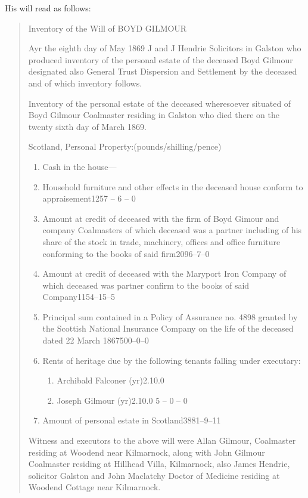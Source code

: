His will read as follows:

\begin{quotation}
Inventory of the Will of BOYD GILMOUR

Ayr the eighth day of May 1869 J and J Hendrie Solicitors in Galston who produced inventory of the personal estate of the deceased Boyd Gilmour designated also General Trust Dispersion and Settlement by the deceased and of which inventory follows.

Inventory of the personal estate of the deceased wheresoever situated of Boyd Gilmour Coalmaster residing in Galston who died there on the twenty sixth day of March 1869.

Scotland, Personal Property:\hfill(pounds/shilling/pence)

\begin{enumerate}
\item Cash in the house\hfill---
\item Household furniture and other effects in the deceased house conform to appraisement\hfill1257 – 6 – 0
\item Amount at credit of deceased with the firm of Boyd Gimour and company Coalmasters of which deceased was a partner including of his share of the stock in trade, machinery, offices and office furniture conforming to the books of said firm\hfill2096--7--0
\item Amount at credit of deceased with the Maryport Iron Company of which deceased was partner confirm to the books of said Company\hfill1154--15--5
\item Principal sum contained in a Policy of Assurance no. 4898 granted by the Scottish National Insurance Company on the life of the deceased dated 22 March 1867\hfill500--0--0
\item Rents of heritage due by the following tenants falling under executary:
\begin{enumerate}
 \item Archibald Falconer (\textonehalf yr)\hfill2.10.0
 \item Joseph Gilmour (\textonehalf yr)\hfill2.10.0 5 – 0 – 0
\end{enumerate}
\item Amount of personal estate in Scotland\hfill3881--9--11
\end{enumerate}

Witness and executors to the above will were Allan Gilmour, Coalmaster residing at Woodend near Kilmarnock, along with John Gilmour Coalmaster residing at Hillhead Villa, Kilmarnock, also James Hendrie, solicitor Galston and John Maclatchy Doctor of Medicine residing at Woodend Cottage near Kilmarnock.
\end{quotation}
